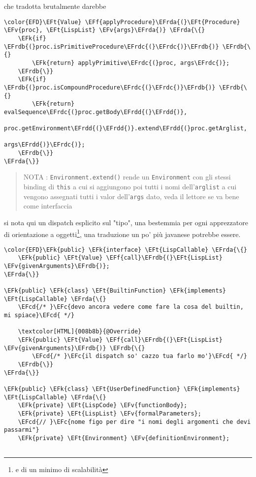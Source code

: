 \documentclass[11pt]{article}
\newcommand{\EFc}[1]{\textcolor{EFc}{#1}} %
\newcommand{\EFcd}[1]{\textcolor{EFcd}{#1}} %
\newcommand{\EFk}[1]{\textcolor{EFk}{#1}} %
\newcommand{\EFf}[1]{\textcolor{EFf}{#1}} %
\newcommand{\EFv}[1]{\textcolor{EFv}{#1}} %
\newcommand{\EFt}[1]{\textcolor{EFt}{#1}} %
\newcommand{\EFrda}[1]{\textcolor{EFrda}{#1}} %
\newcommand{\EFrdb}[1]{\textcolor{EFrdb}{#1}} %
\newcommand{\EFrdc}[1]{\textcolor{EFrdc}{#1}} %
\newcommand{\EFrdd}[1]{\textcolor{EFrdd}{#1}} %
\begin{document}
\begin{enumerate}
che tradotta brutalmente darebbe
\begin{Code}
\begin{Verbatim}
\color{EFD}\EFt{Value} \EFf{applyProcedure}\EFrda{(}\EFt{Procedure} \EFv{proc}, \EFt{LispList} \EFv{args}\EFrda{)} \EFrda{\{}
    \EFk{if} \EFrdb{(}proc.isPrimitiveProcedure\EFrdc{(}\EFrdc{)}\EFrdb{)} \EFrdb{\{}
        \EFk{return} applyPrimitive\EFrdc{(}proc, args\EFrdc{)};
    \EFrdb{\}}
    \EFk{if} \EFrdb{(}proc.isCompoundProcedure\EFrdc{(}\EFrdc{)}\EFrdb{)} \EFrdb{\{}
        \EFk{return} evalSequence\EFrdc{(}proc.getBody\EFrdd{(}\EFrdd{)},
                            proc.getEnvironment\EFrdd{(}\EFrdd{)}.extend\EFrdd{(}proc.getArglist,
                                                         args\EFrdd{)}\EFrdc{)};
    \EFrdb{\}}
\EFrda{\}}
\end{Verbatim}
\end{Code}

\begin{quote}
NOTA : \texttt{Environment.extend()} rende un \texttt{Environment} con gli stessi binding di \texttt{this} a cui si aggiungono poi tutti i nomi dell'\texttt{arglist} a cui vengono assegnati tutti i valor dell'\texttt{args} dato, veda il lettore se va bene come interfaccia
\end{quote}

si nota qui un dispatch esplicito sul "tipo", una bestemmia per ogni apprezzatore di orientazione a oggetti\footnote{e di un minimo di scalabilità}, una traduzione un po' più javanese potrebbe essere.
\begin{Code}
\begin{Verbatim}
\color{EFD}\EFk{public} \EFk{interface} \EFt{LispCallable} \EFrda{\{}
    \EFk{public} \EFt{Value} \EFf{call}\EFrdb{(}\EFt{LispList} \EFv{givenArguments}\EFrdb{)};
\EFrda{\}}

\EFk{public} \EFk{class} \EFt{BuiltinFunction} \EFk{implements} \EFt{LispCallable} \EFrda{\{}
    \EFcd{/* }\EFc{devo ancora vedere come fare la cosa del builtin, mi spiace}\EFcd{ */}

    \textcolor[HTML]{008b8b}{@Override}
    \EFk{public} \EFt{Value} \EFf{call}\EFrdb{(}\EFt{LispList} \EFv{givenArguments}\EFrdb{)} \EFrdb{\{}
        \EFcd{/* }\EFc{il dispatch so' cazzo tua farlo mo'}\EFcd{ */}
    \EFrdb{\}}
\EFrda{\}}

\EFk{public} \EFk{class} \EFt{UserDefinedFunction} \EFk{implements} \EFt{LispCallable} \EFrda{\{}
    \EFk{private} \EFt{LispCode} \EFv{functionBody};
    \EFk{private} \EFt{LispList} \EFv{formalParameters};
    \EFcd{// }\EFc{nome figo per dire "i nomi degli argomenti che devi passarmi"}
    \EFk{private} \EFt{Environment} \EFv{definitionEnvironment};


\end{Verbatim}
\end{Code}
\end{enumerate}
\end{document}
